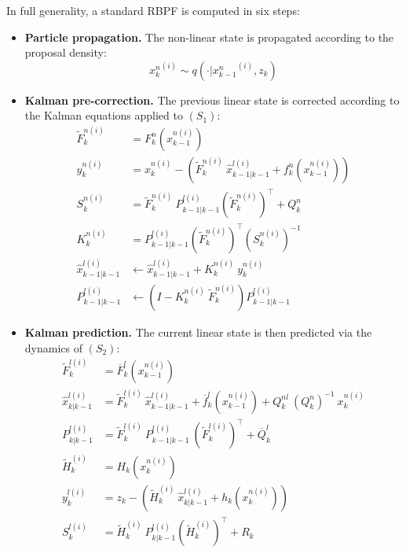 In full generality, a standard RBPF is computed in six steps:
\begin{itemize}
	\item\textbf{Particle propagation.} The non-linear state is propagated according to the proposal density:
	\begin{equation}
		{x_k^n}^{(i)}\sim q\left(\cdot|{x_{k-1}^n}^{(i)},z_k\right)\label{eq:RBPF_propagation}
	\end{equation}
	\item\textbf{Kalman pre-correction.} The previous linear state is corrected according to the Kalman equations applied to $(S_1)$:
	\begin{align}
		\tilde{F}_k^{n(i)}&=F_k^n\left(x_{k-1}^{n(i)}\right)\label{eq:RBPF_precorrection_debut}\\
		y_k^{n(i)}&=x_k^{n(i)}-\left(\tilde{F}_k^{n(i)}\:\hat{x}_{k-1|k-1}^{l(i)}+f_k^n\left(x_{k-1}^{n(i)}\right)\right)\\
		S_k^{n(i)}&=\tilde{F}_k^{n(i)}\:P_{k-1|k-1}^{l(i)}\left(\tilde{F}_k^{n(i)}\right)^\top+Q_k^n\\
		K_k^{n(i)}&=P_{k-1|k-1}^{l(i)}\left(\tilde{F}_k^{n(i)}\right)^\top\left(S_k^{n(i)}\right)^{-1}\\
		\hat{x}_{k-1|k-1}^{l(i)}&\gets\hat{x}_{k-1|k-1}^{l(i)}+K_k^{n(i)}\:y_k^{n(i)}\\
		P_{k-1|k-1}^{l(i)}&\gets\left(I-K_k^{n(i)}\:\tilde{F}_k^{n(i)}\right)P_{k-1|k-1}^{l(i)}\label{eq:RBPF_precorrection_fin}
	\end{align}
	\item\textbf{Kalman prediction.} The current linear state is then predicted via the dynamics of $(S_2)$:
	\begin{align}
		\tilde{F}_k^{l(i)}&=\overline{F}_k^l\left(x_{k-1}^{n(i)}\right)\label{eq:RBPF_prediction_debut}\\
		\hat{x}_{k|k-1}^{l(i)}&=\tilde{F}_k^{l(i)}\:\hat{x}_{k-1|k-1}^{l(i)}+\overline{f}_k^l\left(x_{k-1}^{n(i)}\right)+Q_k^{nl}\:(Q_k^n)^{-1}\:x_k^{n(i)}\\
		P_{k|k-1}^{l(i)}&=\tilde{F}_k^{l(i)}\:P_{k-1|k-1}^{l(i)}\:\left(\tilde{F}_k^{l(i)}\right)^\top+\overline{Q}_k^l\\
		\tilde{H}_k^{(i)}&=H_k\left(x_k^{n(i)}\right)\\
		y_k^{l(i)}&=z_k-\left(\tilde{H}_k^{(i)}\:\hat{x}_{k|k-1}^{l(i)}+h_k\left(x_k^{n(i)}\right)\right)\\
		S_k^{l(i)}&=\tilde{H}_k^{(i)}\:P_{k|k-1}^{l(i)}\left(\tilde{H}_k^{(i)}\right)^\top+R_k\label{eq:RBPF_prediction_fin}
	\end{align}

\end{itemize}
